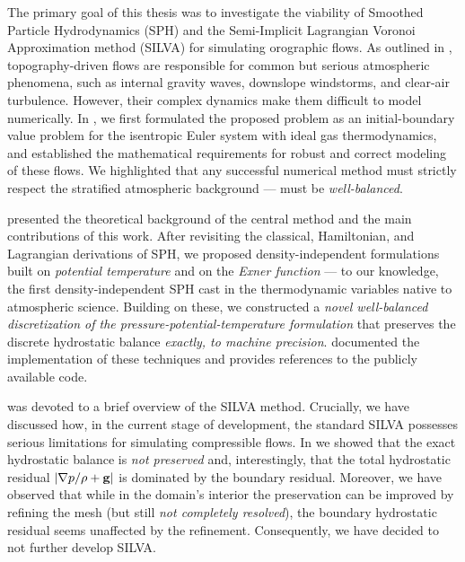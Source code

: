 \label{chap:Conclusion}

The primary goal of this thesis was to investigate the viability of Smoothed Particle Hydrodynamics (SPH) and the Semi-Implicit Lagrangian Voronoi Approximation method (SILVA) for simulating orographic flows. As outlined in , topography-driven flows are responsible for common but serious atmospheric phenomena, such as internal gravity waves, downslope windstorms, and clear-air turbulence. However, their complex dynamics make them difficult to model numerically. In , we first formulated the proposed problem as an initial-boundary value problem for the isentropic Euler system with ideal gas thermodynamics, and established the mathematical requirements for robust and correct modeling of these flows. We highlighted that any successful numerical method must strictly respect the stratified atmospheric background --- must be \emph{well-balanced}.

 presented the theoretical background of the central method and the main contributions of this work. After revisiting the classical, Hamiltonian, and Lagrangian derivations of SPH, we proposed density-independent formulations built on \emph{potential temperature} and on the \emph{Exner function} --- to our knowledge, the first density-independent SPH cast in the thermodynamic variables native to atmospheric science. Building on these, we constructed a \emph{novel well-balanced discretization of the pressure-potential-temperature formulation} that preserves the discrete hydrostatic balance \emph{exactly, to machine precision}.  documented the implementation of these techniques and provides references to the publicly available code.

 was devoted to a brief overview of the SILVA method. Crucially, we have discussed how, in the current stage of development, the standard SILVA possesses serious limitations for simulating compressible flows. In  we showed that the exact hydrostatic balance is \emph{not preserved} and, interestingly, that the total hydrostatic residual $\abs{\nabla p/ \rho + \mathbf{g}}$ is dominated by the boundary residual. Moreover, we have observed that while in the domain's interior the preservation can be improved by refining the mesh (but still \emph{not completely resolved}), the boundary hydrostatic residual seems unaffected by the refinement. Consequently, we have decided to not further develop SILVA.

